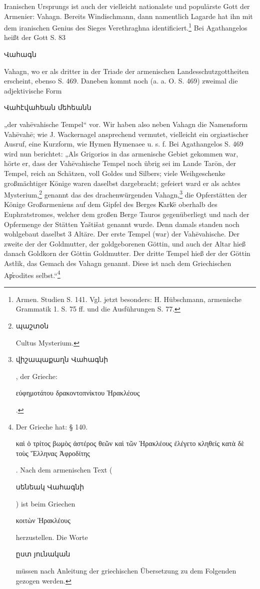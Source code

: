 \documentclass{article}
\begin{document}
Iranischen Ursprungs ist auch der vielleicht nationalste und populärste Gott der Armenier: Vahagn. Bereits Windischmann, dann namentlich Lagarde hat ihn mit dem iranischen Genius des Sieges Verethraghna identificiert.\footnote{Armen. Studien S. 141. Vgl. jetzt besonders: H. Hübschmann, armenische Grammatik 1. S. 75 ff. und die Ausführungen S. 77.} Bei Agathangelos heißt der Gott S. 83 \begin{armenian}Վահագն\end{armenian} Vahagn, wo er als dritter in der Triade der armenischen Landesschutzgottheiten erscheint, ebenso S. 469. Daneben kommt noch (a. a. O. S. 469) zweimal die adjektivische Form \begin{armenian}Վահէվահեան մեհեանն\end{armenian} „der vahēvahische Tempel“ vor. Wir haben also neben Vahagn die Namensform Vahēvahē; wie J. Wackernagel ansprechend vermutet, vielleicht ein orgiastischer Ausruf, eine Kurzform, wie Hymen Hymenaee u. s. f. Bei Agathangelos S. 469 wird nun berichtet: „Als Grigorios in das armenische Gebiet gekommen war, hörte er, dass der Vahēvahische Tempel noch übrig sei im Lande Tarōn, der Tempel, reich an Schätzen, voll Goldes und Silbers; viele Weihgeschenke großmächtiger Könige waren daselbst dargebracht; gefeiert ward er als achtes Mysterium,\footnote{\begin{armenian}պաշտօն\end{armenian} Cultus Mysterium.} genannt das des drachenwürgenden Vahagn,\footnote{\begin{armenian}վիշապաքաղն Վահագնի\end{armenian}, der Grieche: \begin{greek}εὐφημοτάτου δρακοντοπνίκτου Ἡρακλέους\end{greek}.} die Opferstätten der Könige Großarmeniens auf dem Gipfel des Berges K͑ark͑ē oberhalb des Euphratstromes, welcher dem großen Berge Tauros gegenüberliegt und nach der Opfermenge der Stätten Yaštišat genannt wurde. Denn damals standen noch wohlgebaut daselbst 3 Altäre. Der erste Tempel (war) der Vahēvahische. Der zweite der der Goldmutter, der goldgeborenen Göttin, und auch der Altar hieß danach Goldkorn der Göttin Goldmutter. Der dritte Tempel hieß der der Göttin Astłik, das Gemach des Vahagn genannt. Diese ist nach dem Griechischen Ap̔rodites selbst.“\footnote{Der Grieche hat: § 140. \begin{greek}καὶ ὁ τρίτος βωμὸς ἀστέρος θεῶν καὶ τῶν Ἡρακλέους ἐλέγετο κληθείς κατὰ δὲ τοὺς Ἕλληνας Ἀφροδίτης\end{greek}. Nach dem armenischen Text (\begin{armenian}սենեակ Վահագնի\end{armenian}) ist beim Griechen \begin{greek}κοιτὼν Ἡρακλέους\end{greek} herzustellen. Die Worte \begin{armenian}ըստ յունական\end{armenian} müssen nach Anleitung der griechischen Übersetzung zu dem Folgenden gezogen werden.}
\end{document}
